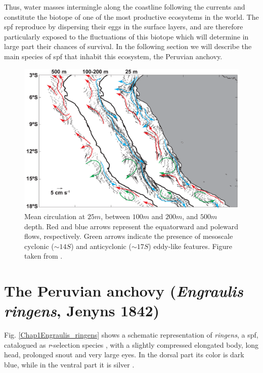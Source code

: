 Thus, water masses intermingle along the coastline following the currents and constitute the biotope of one of the most productive ecosystems in the world. The \acrfull{spf} reproduce by dispersing their eggs in the surface layers, and are therefore particularly exposed to the fluctuations of this biotope which will determine in large part their chances of survival. In the following section we will describe the main species of \acrshort{spf} that inhabit this ecosystem, the Peruvian anchovy.\\

\begin{figure}[H]
	\includegraphics[width=1.0\textwidth]{figures/Chap1MeanCirculationNHCS.png}
	\centering
	\caption{Mean circulation at $25m$, between $100m$ and $200m$, and $500m$ depth. Red and blue arrows represent the equatorward and poleward flows, respectively. Green arrows indicate the presence of mesoscale cyclonic ($\sim 14$\textdegree $S$) and anticyclonic ($\sim 17$\textdegree $S$) eddy-like features. Figure taken from \cite{ChaiDomi2013}.}
	\label{Chap1MeanCirculationNHCS}
\end{figure}

\clearpage
\section{The Peruvian anchovy (\textit{Engraulis ringens}, Jenyns 1842)}\label{Chap1PeruAnch}

Fig. \ref{Chap1Engraulis_ringens} shows a schematic representation of \textit{\gls{ringens}}, a \acrshort{spf}, catalogued as \textit{r}-selection species \citep{Pianka1970}, with a slightly compressed elongated body, long head, prolonged snout and very large eyes. In the dorsal part its color is dark blue, while in the ventral part it is silver \citep{Whit1988}.\\

